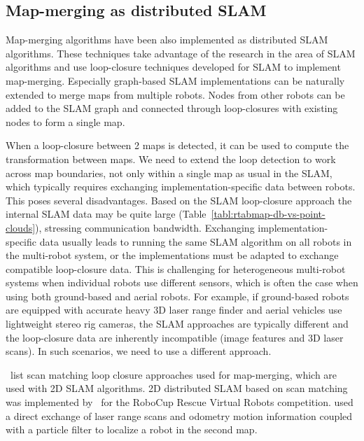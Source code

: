 \subsection{Map-merging as distributed SLAM}
\label{sec:map-merging-distributed-slam}

Map-merging algorithms have been also implemented as distributed \gls{SLAM} algorithms. These techniques take advantage of the research in the area of \gls{SLAM} algorithms and use loop-closure techniques developed for \gls{SLAM} to implement map-merging. Especially graph-based \gls{SLAM} implementations can be naturally extended to merge maps from multiple robots. Nodes from other robots can be added to the \gls{SLAM} graph and connected through loop-closures with existing nodes to form a single map.

When a loop-closure between 2 maps is detected, it can be used to compute the transformation between maps. We need to extend the loop detection to work across map boundaries, not only within a single map as usual in the \gls{SLAM}, which typically requires exchanging implementation-specific data between robots. This poses several disadvantages. Based on the \gls{SLAM} loop-closure approach the internal \gls{SLAM} data may be quite large (Table~\ref{tabl:rtabmap-db-vs-point-clouds}), stressing communication bandwidth. Exchanging implementation-specific data usually leads to running the same \gls{SLAM} algorithm on all robots in the multi-robot system, or the implementations must be adapted to exchange compatible loop-closure data. This is challenging for heterogeneous multi-robot systems when individual robots use different sensors, which is often the case when using both ground-based and aerial robots. For example, if ground-based robots are equipped with accurate heavy \gls{3D} laser range finder and aerial vehicles use lightweight stereo rig cameras, the \gls{SLAM} approaches are typically different and the loop-closure data are inherently incompatible (image features and \gls{3D} laser scans). In such scenarios, we need to use a different approach.

\citet{lee2012survey}~list scan matching loop closure approaches used for map-merging, which are used with \gls{2D} \gls{SLAM} algorithms. \gls{2D} distributed \gls{SLAM} based on scan matching was implemented by~\citet{pfingsthorn2007scalable} for the RoboCup Rescue Virtual Robots competition. \citet{fox2006distributed} used a direct exchange of laser range scans and odometry motion information coupled with a particle filter to localize a robot in the second map.

